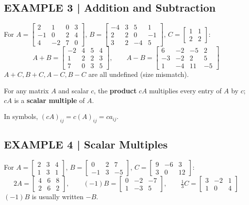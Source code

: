 \documentclass{article}
\theoremstyle{mystyle}
\begin{document}
\subsection*{EXAMPLE 3 | Addition and Subtraction}
For $A=\begin{bmatrix}2&1&0&3\\-1&0&2&4\\4&-2&7&0\end{bmatrix}$, $B=\begin{bmatrix}-4&3&5&1\\2&2&0&-1\\3&2&-4&5\end{bmatrix}$, $C=\begin{bmatrix}1&1\\2&2\end{bmatrix}$:
\[
A+B=\begin{bmatrix}-2&4&5&4\\1&2&2&3\\7&0&3&5\end{bmatrix},\qquad
A-B=\begin{bmatrix}6&-2&-5&2\\-3&-2&2&5\\1&-4&11&-5\end{bmatrix}
\]
$A+C,B+C,A-C,B-C$ are all undefined (size mismatch).

\begin{tcolorbox}[colback=teal!4, colframe=teal!65!black, title=Definition 4, fonttitle=\bfseries, boxrule=0.5mm, arc=3mm]
For any matrix $A$ and scalar $c$, the \textbf{product} $cA$ multiplies every entry of $A$ by $c$; $cA$ is a \textbf{scalar multiple} of $A$.
\end{tcolorbox}
In symbols, $(cA)_{ij}=c(A)_{ij}=ca_{ij}$.

\subsection*{EXAMPLE 4 | Scalar Multiples}
For $A=\begin{bmatrix}2&3&4\\1&3&1\end{bmatrix}$, $B=\begin{bmatrix}0&2&7\\-1&3&-5\end{bmatrix}$, $C=\begin{bmatrix}9&-6&3\\3&0&12\end{bmatrix}$:
\[
2A=\begin{bmatrix}4&6&8\\2&6&2\end{bmatrix},\qquad
(-1)B=\begin{bmatrix}0&-2&-7\\1&-3&5\end{bmatrix},\qquad
\tfrac13C=\begin{bmatrix}3&-2&1\\1&0&4\end{bmatrix}
\]
$(-1)B$ is usually written $-B$.
\end{document}
